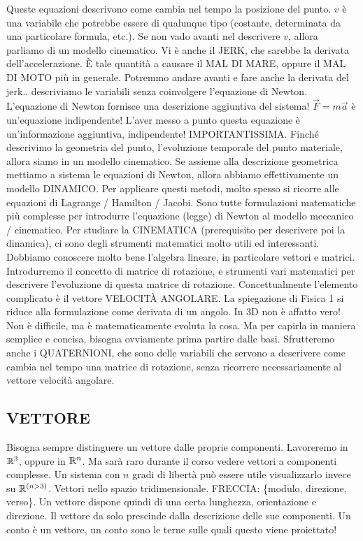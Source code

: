 Queste equazioni descrivono come cambia nel tempo la posizione del punto. $v$ è una variabile che potrebbe essere di qualunque tipo (costante, determinata da una particolare formula, etc.). Se non vado avanti nel descrivere $v$, allora parliamo di un modello cinematico. Vi è anche il JERK, che sarebbe la derivata dell'accelerazione. \`E tale quantità a causare il MAL DI MARE, oppure il MAL DI MOTO più in generale. Potremmo andare avanti e fare anche la derivata del jerk.. descriviamo le variabili senza coinvolgere l'equazione di Newton. L'equazione di Newton fornisce una descrizione aggiuntiva del sistema! $\vec{F} = m\vec{a}$ è un'equazione indipendente! L'aver messo a punto questa equazione è un'informazione aggiuntiva, indipendente! IMPORTANTISSIMA. Finché descrivimo la geometria del punto, l'evoluzione temporale del punto materiale, allora siamo in un modello cinematico. Se assieme alla descrizione geometrica mettiamo a sistema le equazioni di Newton, allora abbiamo effettivamente un modello DINAMICO. Per applicare questi metodi, molto spesso si ricorre alle equazioni di Lagrange / Hamilton / Jacobi. Sono tutte formulazioni matematiche più complesse per introdurre l'equazione (legge) di Newton al modello meccanico / cinematico. Per studiare la CINEMATICA (prerequisito per descrivere poi la dinamica), ci sono degli strumenti matematici molto utili ed interessanti. Dobbiamo conoscere molto bene l'algebra lineare, in particolare vettori e matrici. Introdurremo il concetto di matrice di rotazione, e strumenti vari matematici per descrivere l'evoluzione di questa matrice di rotazione. Concettualmente l'elemento complicato è il vettore VELOCIT\`A ANGOLARE. La spiegazione di Fisica 1 si riduce alla formulazione come derivata di un angolo. In 3D non è affatto vero! Non è difficile, ma è matematicamente evoluta la cosa. Ma per capirla in maniera semplice e concisa, bisogna ovviamente prima partire dalle basi. Sfrutteremo anche i QUATERNIONI, che sono delle variabili che servono a descrivere come cambia nel tempo una matrice di rotazione, senza ricorrere necessariamente al vettore velocità angolare.

\subsection{VETTORE}

Bisogna sempre distinguere un vettore dalle proprie componenti. Lavoreremo in $\mathbb{R}^3$, oppure in $\mathbb{R}^n$. Ma sarà raro durante il corso vedere vettori a componenti complesse. Un sistema con $n$ gradi di libertà può essere utile visualizzarlo invece su $\mathbb{R}^{(n>3)}$. Vettori nello spazio tridimensionale. FRECCIA: \{modulo, direzione, verso\}. Un vettore dispone quindi di una certa lunghezza, orientazione e direzione. Il vettore da solo prescinde dalla descrizione delle sue componenti. Un conto è un vettore, un conto sono le terne sulle quali questo viene proiettato!
 

